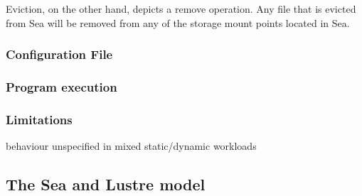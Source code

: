 Eviction, on the other hand, depicts a remove operation. Any file that is evicted from Sea will be removed from any of the storage mount
points located in Sea. 

\subsubsection{Configuration File}
\subsubsection{Program execution}
\subsubsection{Limitations}
behaviour unspecified in mixed static/dynamic workloads

\subsection{The Sea and Lustre model}\label{model}

